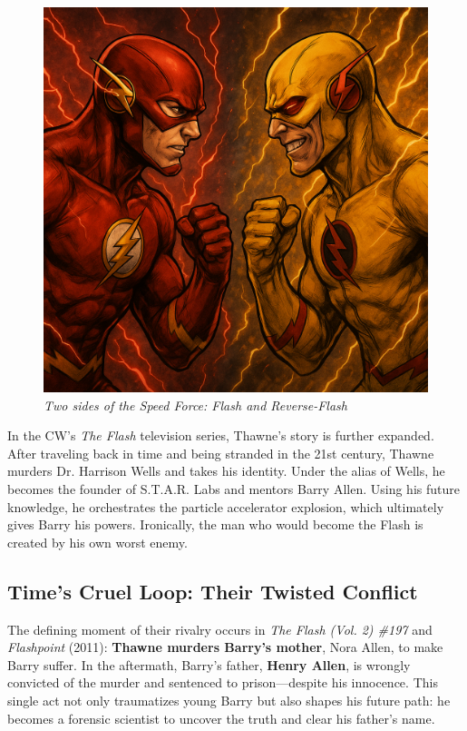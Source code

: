 \begin{figure}[h!]
  \centering
  \includegraphics[width=0.9\linewidth]{vs.png}
  \caption*{\textit{Two sides of the Speed Force: Flash and Reverse-Flash}}
\end{figure}

In the CW's \textit{The Flash} television series, Thawne’s story is further expanded. After traveling back in time and being stranded in the 21st century, Thawne murders Dr. Harrison Wells and takes his identity. Under the alias of Wells, he becomes the founder of S.T.A.R. Labs and mentors Barry Allen. Using his future knowledge, he orchestrates the particle accelerator explosion, which ultimately gives Barry his powers. Ironically, the man who would become the Flash is created by his own worst enemy.

\subsection*{Time’s Cruel Loop: Their Twisted Conflict}
The defining moment of their rivalry occurs in \textit{The Flash (Vol. 2) \#197} and \textit{Flashpoint} (2011): \textbf{Thawne murders Barry’s mother}, Nora Allen, to make Barry suffer. In the aftermath, Barry’s father, \textbf{Henry Allen}, is wrongly convicted of the murder and sentenced to prison—despite his innocence. This single act not only traumatizes young Barry but also shapes his future path: he becomes a forensic scientist to uncover the truth and clear his father's name.


